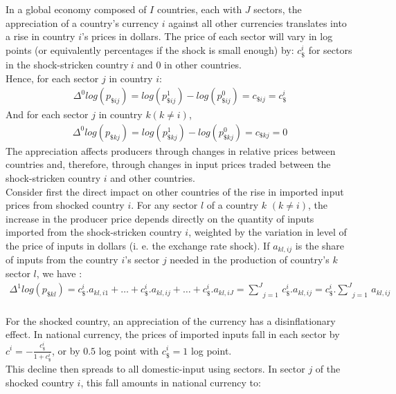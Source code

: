 \documentclass[11pt,a4paper]{article}
\begin{document}
In a global economy composed of $I$ countries, each with $J$ sectors, the appreciation of a country's currency $i$ against all other currencies translates into a rise in country $i$'s prices in dollars. The price of each sector will vary in log points (or equivalently percentages if the shock is small enough) by: $c_\$^i$ for sectors in the shock-stricken country$~i$ and 0 in other countries. \\
Hence, for each sector $j$ in country $i$:
\begin{eqnarray*}
 {{\Delta }^{0}}log(p_{\${ij}})=log(p_{\${ij}}^{1})-log(p_{\${ij}}^{0})=c_{\${ij}}=c_{\$}^i
  \end{eqnarray*}	
And for each sector $j$ in country $k (k\ne i)$,
\begin{eqnarray*}
 {{\Delta }^{0}}log(p_{\${kj}})=log(p_{\${kj}}^{1})-log(p_{\${kj}}^{0})=c_{\${kj}}=0
 \end{eqnarray*}	
The appreciation affects producers through changes in relative prices between countries and, therefore, through changes in input prices traded between the shock-stricken country $i$ and other countries. \\
Consider first the direct impact on other countries of the rise in imported input prices from shocked country $i$. For any sector $l$ of a country $k$ $(k\ne i)$, the increase in the producer price depends directly on the quantity of inputs imported from the shock-stricken country $i$, weighted by the variation in level of the price of inputs in dollars (i. e. the exchange rate shock). If $a_{kl,ij}$ is the share of inputs from the country $i$'s sector $j$ needed in the production of country's $k$ sector $l$, we have :\\
\begin{eqnarray}
\Delta ^1 log(p_{\${kl}})=c_\$^i.a_{kl,i1}+\ldots+c_\$^i.a_{kl,ij}+\ldots+c_\$^i.a_{kl,iJ}=\underset{j=1}{\overset{J}{\mathop\sum}}\,c_\$^i.a_{kl,ij}=c_\$^i.\underset{j=1}{\overset{J}{\mathop\sum}}\,a_{kl,ij}  
\label{eq:eq1} 
\end{eqnarray}
\\
For the shocked country, an appreciation of the currency has a disinflationary effect. In national currency, the prices of imported inputs fall in each sector by $c^i=-\frac{c_\$^i}{1+{c_\$^i}}$, or by $0.5$ log point with $c_\$^i=1$ log point. \\
This decline then spreads to all domestic-input using sectors. In sector $j$ of the shocked country $i$, this fall amounts in national currency to: \\
\end{document}
